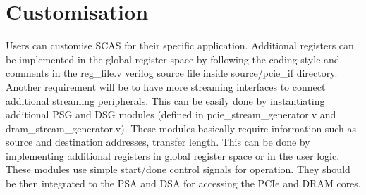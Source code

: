 \chapter{Customisation}
\label{chap_customisation}
Users can customise SCAS for their specific application.
Additional registers can be implemented in the global register space by following the coding style and comments in the reg\_file.v verilog source file inside source/pcie\_if directory.
Another requirement will be to have more streaming interfaces to connect additional streaming peripherals.
This can be easily done by instantiating additional PSG and DSG modules (defined in pcie\_stream\_generator.v and dram\_stream\_generator.v).
These modules basically require information such as source and destination addresses, transfer length.
This can be done by implementing additional registers in global register space or in the user logic.
These modules use simple start/done control signals for operation.
They should be then integrated to the PSA and DSA for accessing the PCIe and DRAM cores.